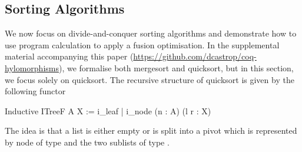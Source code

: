 \documentclass[a4paper,UKenglish,cleveref, autoref, thm-restate]{lipics-v2021}
\newcommand{\mvol}[1]{\textcolor{blue}{\textsc{Michael}: #1}}
\begin{document}
%
%

\subsection{Sorting Algorithms}\label{sec:sorting}
We now focus on divide-and-conquer sorting algorithms and demonstrate how to use
program calculation to apply a fusion optimisation. In the supplemental material
accompanying this paper (\url{https://github.com/dcastrop/coq-hylomorphisms}), we formalise both mergesort and quicksort, but in this
section, we focus solely on quicksort. The recursive structure of quicksort is
given by the following functor
\begin{coqcode}
Inductive ITreeF A X := i_leaf | i_node (n : A) (l r : X)
\end{coqcode}
The idea is that a list is either empty or is split into a pivot which is
represented by node of type  and the two sublists of type .
\end{document}
